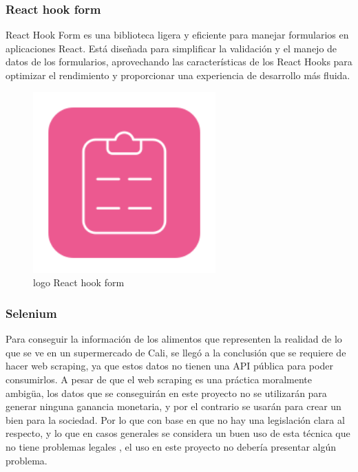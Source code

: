 \subsubsection{React hook form}
\noindent React Hook Form es una biblioteca ligera y eficiente para manejar formularios en aplicaciones React. Est\'a dise\~{n}ada para simplificar la validaci\'on y el manejo de datos de los formularios, aprovechando las caracter\'isticas de los React Hooks para optimizar el rendimiento y proporcionar una experiencia de desarrollo m\'as fluida\cite{ReactHookForm}.


\begin{figure}[H]
        \centering
        \includegraphics[width=7cm]{img/metodologia/react-hook-form-logo-only.png}
        \caption{logo React hook form}
        \label{fig:logoReactHookForm}
    \end{figure}
    
\subsubsection{Selenium}
\noindent Para conseguir la informaci\'on de los alimentos que representen la realidad de lo que se ve en un supermercado de Cali, se lleg\'o a la conclusi\'on que se requiere de hacer web scraping, ya que estos datos no tienen una API p\'ublica para poder consumirlos. A pesar de que el web scraping es una pr\'actica moralmente ambig\"ua, los datos que se conseguir\'an en este proyecto no se utilizar\'an para generar ninguna ganancia monetaria, y por el contrario se usar\'an para crear un bien para la sociedad. Por lo que con base en que no hay una legislaci\'on clara al respecto, y lo que en casos generales se considera un buen uso de esta t\'ecnica que no tiene problemas legales \cite{juristasRiesgosLegalesWeb2023}, el uso en este proyecto no deber\'ia presentar alg\'un problema. 


